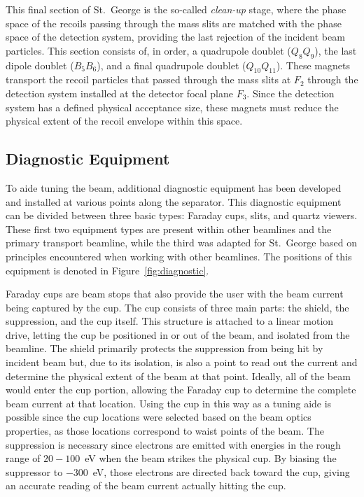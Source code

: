This final section of St.\ George is the so-called \textit{clean-up}
stage, where the phase space of the recoils passing through the mass
slits are matched with the phase space of the detection system,
providing the last rejection of the incident beam particles. This
section consists of, in order, a quadrupole doublet ($Q_8Q_9$), the last
dipole doublet ($B_5B_6$), and a final quadrupole doublet
($Q_{10}Q_{11}$). These magnets transport the recoil particles that
passed through the mass slits at $F_2$ through the detection system
installed at the detector focal plane $F_3$. Since the detection system
has a defined physical acceptance size, these magnets must reduce the
physical extent of the recoil envelope within this space.


\subsection{Diagnostic Equipment}
\label{sec:diagnostic}

To aide tuning the beam, additional diagnostic equipment has been
developed and installed at various points along the separator. This
diagnostic equipment can be divided between three basic types: Faraday
cups, slits, and quartz viewers. These first two equipment types are
present within other beamlines and the primary transport beamline, while
the third was adapted for St.\ George based on principles encountered
when working with other beamlines. The positions of this equipment is
denoted in Figure~\ref{fig:diagnostic}.

Faraday cups are beam stops that also provide the user with the beam
current being captured by the cup. The cup consists of three main parts:
the shield, the suppression, and the cup itself. This structure is
attached to a linear motion drive, letting the cup be positioned in or
out of the beam, and isolated from the beamline. The shield primarily
protects the suppression from being hit by incident beam but, due to its
isolation, is also a point to read out the current and determine the
physical extent of the beam at that point. Ideally, all of the beam
would enter the cup portion, allowing the Faraday cup to determine the
complete beam current at that location. Using the cup in this way as a
tuning aide is possible since the cup locations were selected based on
the beam optics properties, as those locations correspond to waist
points of the beam. The suppression is necessary since electrons are
emitted with energies in the rough range of $20-100$~eV when the beam
strikes the physical cup. By biasing the suppressor to $-300$~eV, those
electrons are directed back toward the cup, giving an accurate reading
of the beam current actually hitting the cup.

